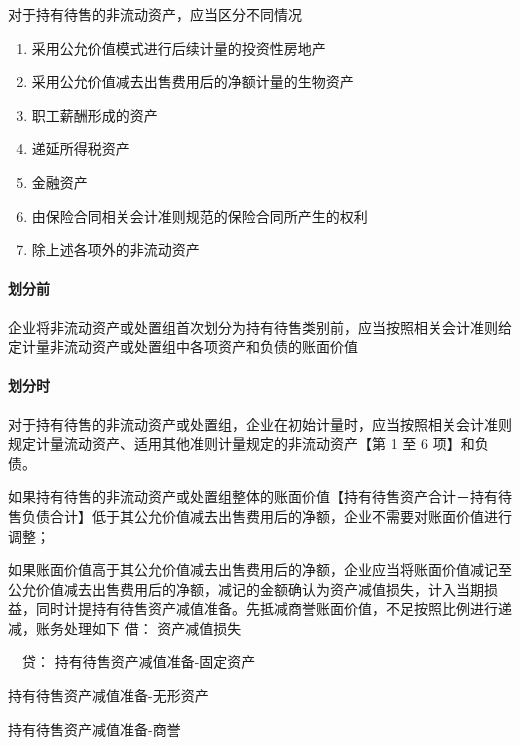 \documentclass[UTF8,12pt]{ctexart}
\newenvironment{Dr}{\noindent 借：}{\par}
\newenvironment{Cr}{\noindent \ \ 贷：}{\par}
\numberwithin{equation}{section} %
\numberwithin{figure}{section}
\numberwithin{table}{section}
\begin{document}
	对于持有待售的非流动资产，应当区分不同情况
	\begin{enumerate}
		\item 采用公允价值模式进行后续计量的投资性房地产
		
		\item 采用公允价值减去出售费用后的净额计量的生物资产
		
		\item 职工薪酬形成的资产
		
		\item 递延所得税资产
		
		\item 金融资产
		
		\item 由保险合同相关会计准则规范的保险合同所产生的权利
		
		\item 除上述各项外的非流动资产
	\end{enumerate}
	
	\paragraph{划分前}
	企业将非流动资产或处置组首次划分为持有待售类别前，应当按照相关会计准则给定计量非流动资产或处置组中各项资产和负债的账面价值
	
	\paragraph{划分时}
	对于持有待售的非流动资产或处置组，企业在初始计量时，应当按照相关会计准则规定计量流动资产、适用其他准则计量规定的非流动资产【第 1 至 6 项】和负债。
	
	如果持有待售的非流动资产或处置组整体的账面价值【持有待售资产合计－持有待售负债合计】低于其公允价值减去出售费用后的净额，企业不需要对账面价值进行调整；
	
	如果账面价值高于其公允价值减去出售费用后的净额，企业应当将账面价值减记至公允价值减去出售费用后的净额，减记的金额确认为资产减值损失，计入当期损益，同时计提持有待售资产减值准备。先抵减商誉账面价值，不足按照比例进行递减，账务处理如下
	\begin{Dr}
		资产减值损失
	\end{Dr}
	\begin{Cr}
		持有待售资产减值准备-固定资产
		
		持有待售资产减值准备-无形资产
		
		持有待售资产减值准备-商誉
		
	\end{Cr}
	
\end{document}
